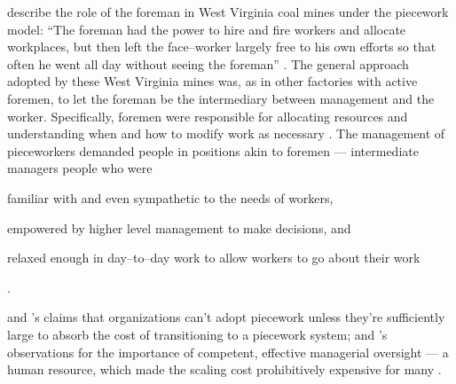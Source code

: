 \documentclass[trackingWork]{subfiles}
\begin{document}
\citeauthor{10.2307/2118435} describe the role of the foreman in West Virginia coal mines under the piecework model:
``The foreman had the power to hire and fire workers and allocate workplaces,
but then left the face--worker largely free to his own efforts so that
often he went all day without seeing the foreman''
\cite{10.2307/2118435}.
The general approach adopted by these West Virginia mines was,
as in other factories with active foremen,
to let the foreman be the intermediary between management and the worker.
Specifically, foremen were responsible for allocating resources and
understanding when and how to modify work as necessary
\cite{wray1949marginal}.
The management of pieceworkers %
demanded people in positions akin to foremen
--- intermediate managers people who were
\begin{inlinelist}
  \item familiar with and even sympathetic to the needs of workers,
  \item empowered by higher level management to make decisions, and
  \item relaxed enough in day--to--day work to allow workers to go about their work
\end{inlinelist}
\cite{wray1949marginal,10.2307/2118435}.



\subsubsubsection{\whatchanged}
\citeauthor{Brown01041990} and \citeauthor{10.2307/23702539}'s claims that
organizations can't adopt piecework unless
they're sufficiently large to absorb the cost of transitioning to a piecework system;
\citeauthor{10.2307/2118435} and \citeauthor{wray1949marginal}'s observations for
the importance of competent, effective managerial oversight
--- a human resource, which made the scaling cost prohibitively expensive for many
\cite{10.2307/2118435,wray1949marginal,10.2307/23702539,Brown01041990}.
\end{document}

